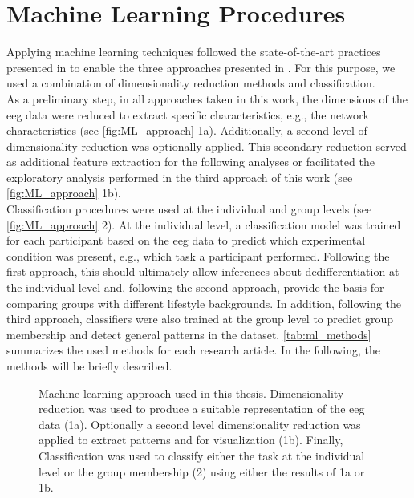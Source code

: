 \section{Machine Learning Procedures}
Applying machine learning techniques followed the state-of-the-art practices presented in  to enable the three approaches presented in . For this purpose, we used a combination of dimensionality reduction methods and classification.\\
As a preliminary step, in all approaches taken in this work, the dimensions of the \gls{eeg} data were reduced to extract specific characteristics, e.g., the network characteristics (see \autoref{fig:ML_approach} 1a). Additionally, a second level of dimensionality reduction was optionally applied. This secondary reduction served as additional feature extraction for the following analyses or facilitated the exploratory analysis performed in the third approach of this work (see \autoref{fig:ML_approach} 1b).\\
Classification procedures were used at the individual and group levels (see \autoref{fig:ML_approach} 2). At the individual level, a classification model was trained for each participant based on the \gls{eeg} data to predict which experimental condition was present, e.g., which task a participant performed. Following the first approach, this should ultimately allow inferences about dedifferentiation at the individual level and, following the second approach, provide the basis for comparing groups with different lifestyle backgrounds. In addition, following the third approach, classifiers were also trained at the group level to predict group membership and detect general patterns in the dataset. \autoref{tab:ml_methods}  summarizes the used methods for each research article. In the following, the methods will be briefly described.

\begin{figure}[h]
\begin{center}

\caption[Machine learning approach used in this thesis]{Machine learning approach used in this thesis. Dimensionality reduction was used to produce a suitable representation of the \gls{eeg} data (1a). Optionally a second level dimensionality reduction was applied to extract patterns and for visualization (1b). Finally, Classification was used to classify either the task at the individual level or the group membership (2) using either the results of 1a or 1b.}
\label{fig:ML_approach}
\end{center}
\end{figure}

